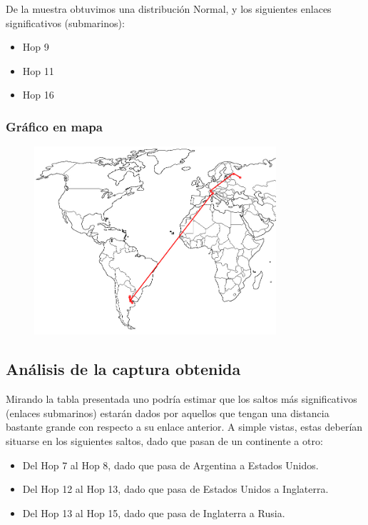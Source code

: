 De la muestra obtuvimos una distribuci\'on Normal, y los siguientes enlaces significativos (submarinos):
\begin{itemize}
\item Hop 9
\item Hop 11
\item Hop 16
\end{itemize}

\subsubsection{Gr\'afico en mapa}

\begin{figure}[h]
    \includegraphics[width=0.8\textwidth]{img_analisis1/mapa.jpg}
    
\end{figure}
\vspace{0.25cm}


\subsection{An\'alisis de la captura obtenida}

Mirando la tabla presentada uno podr\'ia estimar que los saltos m\'as significativos (enlaces submarinos) estar\'an dados por aquellos que tengan una distancia bastante grande con respecto a su enlace anterior. A simple vistas, estas deber\'ian situarse en los siguientes saltos, dado que pasan de un continente a otro:
\begin{itemize}
\item Del Hop 7 al Hop 8, dado que pasa de Argentina a Estados Unidos.
\item Del Hop 12 al Hop 13, dado que pasa de Estados Unidos a Inglaterra.
\item Del Hop 13 al Hop 15, dado que pasa de Inglaterra a Rusia.
\end{itemize}

